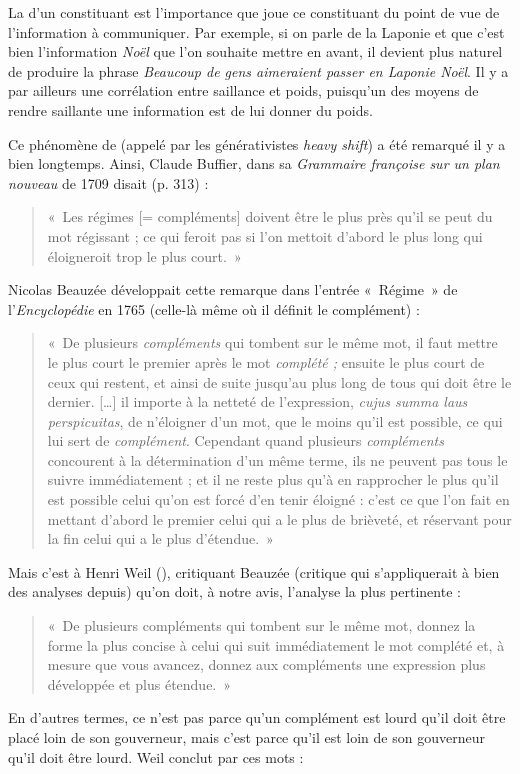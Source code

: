 La  d’un constituant est l’importance que joue ce constituant du point de vue de l’information à communiquer. Par exemple, si on parle de la Laponie et que c’est bien l’information \textit{Noël} que l’on souhaite mettre en avant, il devient plus naturel de produire la phrase \textit{Beaucoup de gens aimeraient passer en Laponie Noël}. Il y a par ailleurs une corrélation entre saillance et poids, puisqu’un des moyens de rendre saillante une information est de lui donner du poids.

Ce phénomène de  (appelé par les générativistes \textit{heavy shift}) a été remarqué il y a bien longtemps. Ainsi, Claude Buffier, dans sa \textit{Grammaire françoise sur un plan nouveau} de 1709 disait (p. 313) :

\begin{quote}
    «~Les régimes [= compléments] doivent être le plus près qu’il se peut du mot régissant ; ce qui feroit pas si l’on mettoit d’abord le plus long qui éloigneroit trop le plus court.~»
\end{quote}
Nicolas Beauzée développait cette remarque dans l’entrée «~Régime~» de l’\textit{Encyclopédie} en 1765 (celle-là même où il définit le complément) :

\begin{quote}
    «~De plusieurs \textit{compléments} qui tombent sur le même mot, il faut mettre le plus court le premier après le mot \textit{complété ;} ensuite le plus court de ceux qui restent, et ainsi de suite jusqu’au plus long de tous qui doit être le dernier. […] il importe à la netteté de l’expression, \textit{\textit{cujus summa laus perspicuitas}}, de n’éloigner d’un mot, que le moins qu’il est possible, ce qui lui sert de \textit{complément}. Cependant quand plusieurs \textit{compléments} concourent à la détermination d’un même terme, ils ne peuvent pas tous le suivre immédiatement ; et il ne reste plus qu’à en rapprocher le plus qu’il est possible celui qu’on est forcé d’en tenir éloigné : c’est ce que l’on fait en mettant d’abord le premier celui qui a le plus de brièveté, et réservant pour la fin celui qui a le plus d’étendue.~»
\end{quote}
Mais c’est à Henri Weil (\citeyear[97--102]{weil1844de}), critiquant Beauzée (critique qui s’appliquerait à bien des analyses depuis) qu’on doit, à notre avis, l’analyse la plus pertinente :

\begin{quote}
    «~De plusieurs compléments qui tombent sur le même mot, donnez la forme la plus concise à celui qui suit immédiatement le mot complété et, à mesure que vous avancez, donnez aux compléments une expression plus développée et plus étendue.~»
\end{quote}
En d’autres termes, ce n’est pas parce qu’un complément est lourd qu’il doit être placé loin de son gouverneur, mais c’est parce qu’il est loin de son gouverneur qu’il doit être lourd. Weil conclut par ces mots :

